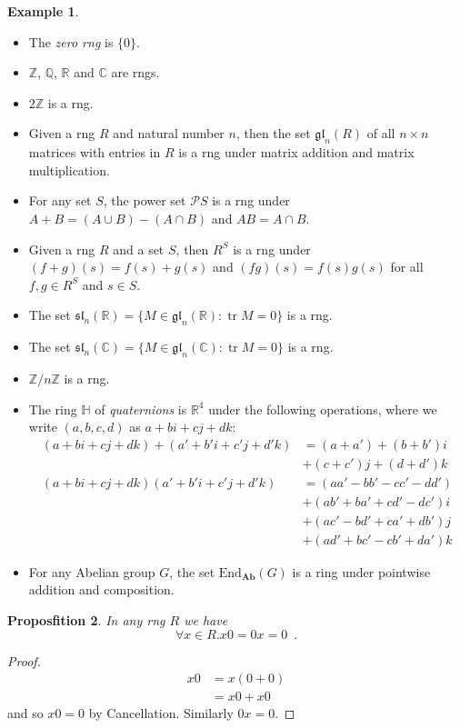 \documentclass{book}
\let\qed\relax
\newtheorem{prop}{Proposfition}[chapter]
\theoremstyle{definition}
\newtheorem{ex}[prop]{Example}
\newcommand{\Ab}{\ensuremath{\mathbf{Ab}}}
\newcommand{\End}[2]{\ensuremath{\mathrm{End}_{#1} \left( {#2} \right)}}
\newcommand{\gl}[2]{\ensuremath{\mathfrak{gl}_{#1} \left( {#2} \right)}}
\renewcommand{\sl}[2]{\ensuremath{\mathfrak{sl}_{#1} \left( {#2} \right)}}
\newcommand{\tr}{\ensuremath{\operatorname{tr}}}
\begin{document}
\begin{ex}
\begin{itemize}
\item The \emph{zero rng} is $\{0\}$.
\item $\mathbb{Z}$, $\mathbb{Q}$, $\mathbb{R}$ and $\mathbb{C}$ are rngs.
\item
$2 \mathbb{Z}$ is a rng.
\item
Given a rng $R$ and natural number $n$, then the set $\gl{n}{R}$ of all $n \times n$ matrices with entries in $R$ is a rng under matrix addition and matrix multiplication.
\item
For any set $S$, the power set $\mathcal{P} S$ is a rng under $A + B = (A \cup B) - (A \cap B)$ and $AB = A \cap B$.
\item
Given a rng $R$ and a set $S$, then $R^S$ is a rng under $(f + g)(s) = f(s) + g(s)$ and $(fg)(s) = f(s)g(s)$ for all $f,g \in R^S$ and $s \in S$.
\item The set $\sl{n}{\mathbb{R}} = \{ M \in \gl{n}{\mathbb{R}} : \tr M = 0 \}$ is a rng.
\item The set $\sl{n}{\mathbb{C}} = \{ M \in \gl{n}{\mathbb{C}} : \tr M = 0 \}$ is a rng.
\item $\mathbb{Z} / n \mathbb{Z}$ is a rng.
\item The ring $\mathbb{H}$ of \emph{quaternions} is $\mathbb{R}^4$ under the following operations, where we write $(a,b,c,d)$ as $a + bi + cj + dk$:
\begin{align*}
(a + bi + cj + dk) + (a' + b'i + c'j + d'k) & = (a + a') + (b + b')i\\
&  + (c + c')j + (d + d')k \\
(a + bi + cj + dk)(a' + b'i + c'j + d'k) & = 
(aa' - bb' - cc' - dd') \\
& + (ab' + ba' + cd' - dc') i \\
& + (ac' - bd' + ca' + db')j \\
& + (ad' + bc' - cb' + da') k
\end{align*}
\item For any Abelian group $G$, the set $\End{\Ab}{G}$ is a ring under pointwise addition and composition.
\end{itemize}
\end{ex}

\begin{prop}
In any rng $R$ we have
\[ \forall x \in R. x0 = 0x = 0 \enspace . \]
\end{prop}

\begin{proof}
\pf
\begin{align*}
x0 & = x(0+0) \\
& = x0+x0
\end{align*}
and so $x0 = 0$ by Cancellation. Similarly $0x = 0$. \qed
\end{proof}
\end{document}
